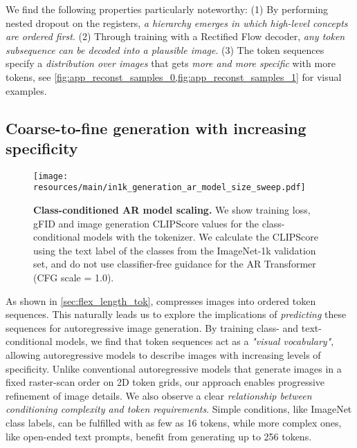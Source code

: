 We find the following properties particularly noteworthy: (1) By performing nested dropout on the registers, \textit{a hierarchy emerges in which high-level concepts are ordered first}. (2) Through training \ours with a Rectified Flow decoder, \textit{any token subsequence can be decoded into a plausible image}. (3) The token sequences specify a \textit{distribution over images} that gets \textit{more and more specific} with more tokens, see \cref{fig:app_reconst_samples_0,fig:app_reconst_samples_1} for visual examples.


\subsection{Coarse-to-fine generation with increasing specificity}
\label{sec:specificity}

\begin{figure*}[ht!]
\centering
\texttt{[image: resources/main/in1k\_generation\_ar\_model\_size\_sweep.pdf]}
\caption{
\textbf{Class-conditioned AR model scaling.}
We show training loss, gFID and image generation CLIPScore values for the class-conditional models with the \oursxlarge tokenizer. We calculate the CLIPScore using the text label of the classes from the ImageNet-1k validation set, and do not use classifier-free guidance for the AR Transformer (CFG scale = 1.0).
}
\label{fig:main_c2i_ar_model_scaling}
\vspace{-1.5em}
\end{figure*}

As shown in \cref{sec:flex_length_tok}, \ours compresses images into ordered token sequences. This naturally leads us to explore the implications of \textit{predicting} these sequences for autoregressive image generation. By training class- and text-conditional models, we find that \ours token sequences act as a \textit{"visual vocabulary"}, allowing autoregressive models to describe images with increasing levels of specificity. Unlike conventional autoregressive models that generate images in a fixed raster-scan order on 2D token grids, our approach enables progressive refinement of image details. We also observe a clear \textit{relationship between conditioning complexity and token requirements}. Simple conditions, like ImageNet class labels, can be fulfilled with as few as 16 tokens, while more complex ones, like open-ended text prompts, benefit from generating up to 256 tokens.

